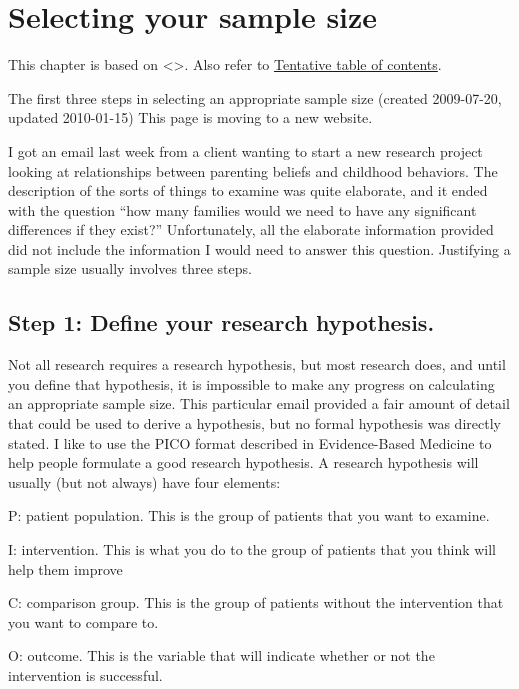 \documentclass[
  letterpaper,
  DIV=11,
  numbers=noendperiod]{scrreprt}
\begin{document}
\chapter{Selecting your sample size}\label{selecting-your-sample-size}

This chapter is based on \textless{}\textgreater. Also refer to
\href{http://www.pmean.com/10/Contents.html}{Tentative table of
contents}.

The first three steps in selecting an appropriate sample size (created
2009-07-20, updated 2010-01-15) This page is moving to a new website.

I got an email last week from a client wanting to start a new research
project looking at relationships between parenting beliefs and childhood
behaviors. The description of the sorts of things to examine was quite
elaborate, and it ended with the question ``how many families would we
need to have any significant differences if they exist?'' Unfortunately,
all the elaborate information provided did not include the information I
would need to answer this question. Justifying a sample size usually
involves three steps.

\section{Step 1: Define your research
hypothesis.}\label{step-1-define-your-research-hypothesis.}

Not all research requires a research hypothesis, but most research does,
and until you define that hypothesis, it is impossible to make any
progress on calculating an appropriate sample size. This particular
email provided a fair amount of detail that could be used to derive a
hypothesis, but no formal hypothesis was directly stated. I like to use
the PICO format described in Evidence-Based Medicine to help people
formulate a good research hypothesis. A research hypothesis will usually
(but not always) have four elements:

P: patient population. This is the group of patients that you want to
examine.

I: intervention. This is what you do to the group of patients that you
think will help them improve

C: comparison group. This is the group of patients without the
intervention that you want to compare to.

O: outcome. This is the variable that will indicate whether or not the
intervention is successful.
\end{document}
